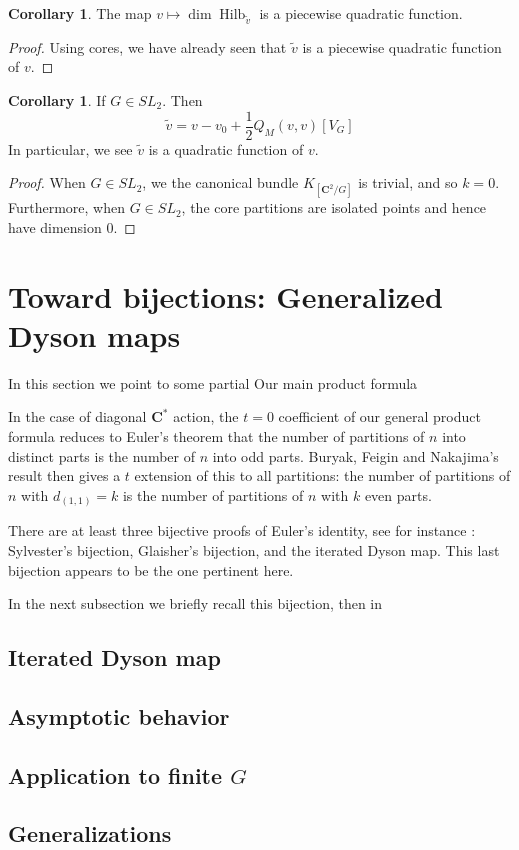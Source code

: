 \documentclass{amsart}[12pt]
\theoremstyle{definition}
\newtheorem{corollary}[dummy]{Corollary}
\newcommand{\C}{\mathbf{C}}
\DeclareMathOperator{\Hilb}{Hilb}
\begin{document}
\begin{corollary}
The map $v\mapsto \dim\Hilb_{\tilde{v}}$ is a piecewise quadratic function.
\end{corollary}

\begin{proof}
Using cores, we have already seen that $\tilde{v}$ is a piecewise quadratic function of $v$.  
\end{proof}


\begin{corollary}  If $G\in SL_2$. Then
$$\tilde{v}=v-v_0+\frac{1}{2}Q_M(v,v)[V_G]$$
In particular, we see $\tilde{v}$ is a quadratic function of $v$.
\end{corollary}

\begin{proof}
When $G\in SL_2$, we the canonical bundle $K_{[\C^2/G]}$ is trivial, and so $k=0$.  Furthermore, when $G\in SL_2$, the core partitions are isolated points and hence have dimension 0.
\end{proof}






\section{Toward bijections: Generalized Dyson maps} \label{sec:dyson}

In this section we point to some partial Our main product formula 

In the case of diagonal $\C^*$ action, the $t=0$ coefficient of our general product formula reduces to Euler's theorem that the number of partitions of $n$ into distinct parts is the number of $n$ into odd parts.  Buryak, Feigin and Nakajima's result then gives a $t$ extension of this to all partitions: the number of partitions of $n$ with $d_{(1,1)}=k$ is the number of partitions of $n$ with $k$ even parts.

There are at least three bijective proofs of Euler's identity, see for instance \cite{pak}: Sylvester's bijection, Glaisher's bijection, and the iterated Dyson map.  This last bijection appears to be the one pertinent here.

In the next subsection we briefly recall this bijection, then in 
\subsection{Iterated Dyson map} \label{sec:review-dyson}


\subsection{Asymptotic behavior} \label{sec-asymptotic-dyson}

\subsection{Application to finite \texorpdfstring{$G$}{G}} 


\subsection{Generalizations} \label{sec:generalized-dyson}






\end{document}
